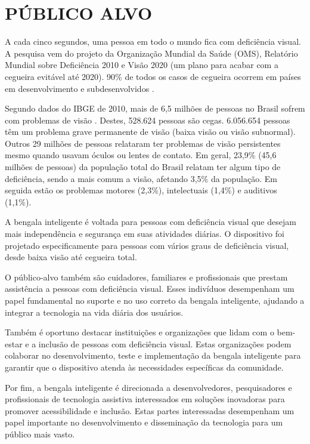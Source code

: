 \section{PÚBLICO ALVO}
A cada cinco segundos, uma pessoa em todo o mundo fica com deficiência visual. A pesquisa vem do projeto da Organização Mundial da Saúde (OMS), Relatório Mundial sobre Deficiência 2010 e Visão 2020 (um plano para acabar com a cegueira evitável até 2020). 90\% de todos os casos de cegueira ocorrem em países em desenvolvimento e subdesenvolvidos \cite{vision-2010}. 

Segundo dados do IBGE de 2010, mais de 6,5 milhões de pessoas no Brasil sofrem com problemas de visão \cite{mec-direitos-pcd}. Destes, 528.624 pessoas são cegas. 6.056.654 pessoas têm um problema grave permanente de visão (baixa visão ou visão subnormal). Outros 29 milhões de pessoas relataram ter problemas de visão persistentes mesmo quando usavam óculos ou lentes de contato. Em geral, 23,9\% (45,6 milhões de pessoas) da população total do Brasil relatam ter algum tipo de deficiência, sendo a mais comum a visão, afetando 3,5\% da população. Em seguida estão os problemas motores (2,3\%), intelectuais (1,4\%) e auditivos (1,1\%).

A bengala inteligente é voltada para pessoas com deficiência visual que desejam mais independência e segurança em suas atividades diárias. O dispositivo foi projetado especificamente para pessoas com vários graus de deficiência visual, desde baixa visão até cegueira total.

O público-alvo também são cuidadores, familiares e profissionais que prestam assistência a pessoas com deficiência visual. Esses indivíduos desempenham um papel fundamental no suporte e no uso correto da bengala inteligente, ajudando a integrar a tecnologia na vida diária dos usuários.

Também é oportuno destacar instituições e organizações que lidam com o bem-estar e a inclusão de pessoas com deficiência visual. Estas organizações podem colaborar no desenvolvimento, teste e implementação da bengala inteligente para garantir que o dispositivo atenda às necessidades específicas da comunidade.

Por fim, a bengala inteligente é direcionada a desenvolvedores, pesquisadores e profissionais de tecnologia assistiva interessados em soluções inovadoras para promover acessibilidade e inclusão. Estas partes interessadas desempenham um papel importante no desenvolvimento e disseminação da tecnologia para um público mais vasto.

